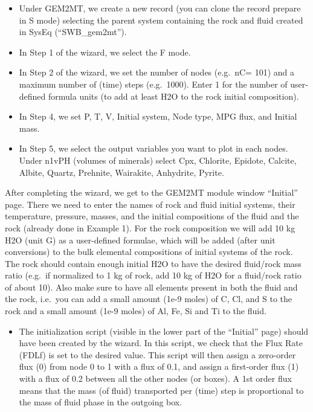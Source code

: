 \documentclass[
]{book}
\providecommand{\tightlist}{%
  \setlength{\itemsep}{0pt}\setlength{\parskip}{0pt}}
\begin{document}
\begin{itemize}
\item
  Under GEM2MT, we create a new record (you can clone the record prepare in S mode) selecting the parent system containing the rock and fluid created in SysEq (``SWB\_gem2mt'').
\item
  In Step 1 of the wizard, we select the F mode.
\item
  In Step 2 of the wizard, we set the number of nodes (e.g.~nC= 101) and a maximum number of (time) steps (e.g.~1000). Enter 1 for the number of user-defined formula units (to add at least H2O to the rock initial composition).
\item
  In Step 4, we set P, T, V, Initial system, Node type, MPG flux, and Initial mass.
\item
  In Step 5, we select the output variables you want to plot in each nodes. Under n1vPH (volumes of minerals) select Cpx, Chlorite, Epidote, Calcite, Albite, Quartz, Prehnite, Wairakite, Anhydrite, Pyrite.
\end{itemize}

After completing the wizard, we get to the GEM2MT module window ``Initial'' page. There we need to enter the names of rock and fluid initial systems, their temperature, pressure, masses, and the initial compositions of the fluid and the rock (already done in Example 1). For the rock composition we will add 10 kg H2O (unit G) as a user-defined formulae, which will be added (after unit conversions) to the bulk elemental compositions of initial systems of the rock. The rock should contain enough initial H2O to have the desired fluid/rock mass ratio (e.g.~if normalized to 1 kg of rock, add 10 kg of H2O for a fluid/rock ratio of about 10). Also make sure to have all elements present in both the fluid and the rock, i.e.~you can add a small amount (1e-9 moles) of C, Cl, and S to the rock and a small amount (1e-9 moles) of Al, Fe, Si and Ti to the fluid.

\begin{itemize}
\tightlist
\item
  The initialization script (visible in the lower part of the ``Initial'' page) should have been created by the wizard. In this script, we check that the Flux Rate (FDLf) is set to the desired value. This script will then assign a zero-order flux (0) from node 0 to 1 with a flux of 0.1, and assign a first-order flux (1) with a flux of 0.2 between all the other nodes (or boxes). A 1st order flux means that the mass (of fluid) transported per (time) step is proportional to the mass of fluid phase in the outgoing box.
\end{itemize}
\end{document}

